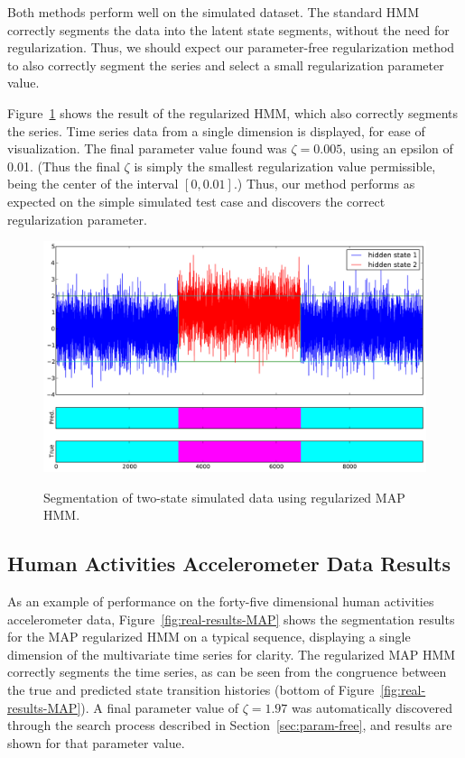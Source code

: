 \documentclass[12pt]{article}
\begin{document}
Both methods perform well on the simulated dataset. The standard HMM correctly segments the data into the latent state segments, without the need for regularization. Thus, we should expect our parameter-free regularization method to also correctly segment the series and select a small regularization parameter value.

Figure~\ref{fig:sim-results-MAP} shows the result of the regularized HMM, which also correctly segments the series. Time series data from a single dimension is displayed, for ease of visualization. The final parameter value found was $\zeta = 0.005$, using an epsilon of 0.01. (Thus the final $\zeta$ is simply the smallest regularization value permissible, being the center of the interval $[0,0.01]$.) Thus, our method performs as expected on the simple simulated test case and discovers the correct regularization parameter.

\begin{figure}[htbp]
  \caption{Segmentation of two-state simulated data using regularized MAP HMM.}
  \centering
    \includegraphics[width=.8\linewidth]{images/MAP_PARAM_FREE_results_sim_data_0,00_2_states.pdf}
    \label{fig:sim-results-MAP}
\end{figure}

\subsection{Human Activities Accelerometer Data Results}\label{sec:quantitative}

As an example of performance on the forty-five dimensional human activities accelerometer data, Figure~\ref{fig:real-results-MAP} shows the segmentation results for the MAP regularized HMM on a typical sequence, displaying a single dimension of the multivariate time series for clarity. The regularized MAP HMM correctly segments the time series, as can be seen from the congruence between the true and predicted state transition histories (bottom of Figure~\ref{fig:real-results-MAP}). A final parameter value of $\zeta = 1.97$ was automatically discovered through the search process described in Section~\ref{sec:param-free}, and results are shown for that parameter value.
\end{document}
